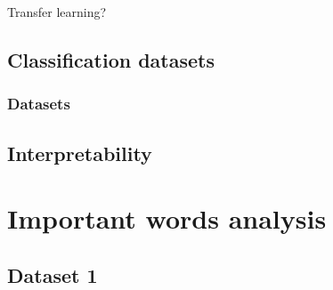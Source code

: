    Transfer learning?

    \section{Classification datasets}
        \subsection{Datasets}
            \cite{conneau2017supervised} %

    \section{Interpretability}
        \cite{ribeiro2016should} %

\chapter{Important words analysis}

    \section{Dataset 1}
